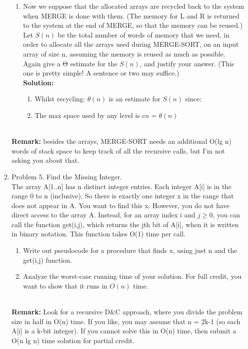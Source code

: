 \documentclass[11pt]{article}
\begin{document}
\begin{enumerate}
\begin{enumerate}
        \item Now we suppose that the allocated arrays are recycled back to the system when MERGE is done with them. (The memory for L and R is returned to the system at the end of MERGE, so that the memory can be reused.) Let $S(n)$ be the total number of words of memory that we need, in order to allocate all the arrays used during MERGE-SORT, on an input array of size n, assuming the memory is reused as much as possible. Again give a Θ estimate for the $S(n)$, and justify your answer. (This one is pretty simple! A sentence or two may suffice.)
        \vspace{0.3cm}\\\textbf{Solution:}
        \begin{enumerate}
            \item Whilst recycling: $\theta (n)$ is an estimate for $S(n)$ since:
            \item The max space used by any level is $cn$ = $\theta (n)$
        \end{enumerate}
        
    \end{enumerate}
        \\
        \textbf{Remark: }besides the arrays, MERGE-SORT needs an additional O(lg n) words of stack space to keep track of all the recursive calls, but I'm not asking you about that.

\item Problem 5. Find the Missing Integer.\\
The array A[1..n] has n distinct integer entries. Each integer A[i] is in the range 0 to n (inclusive). So there is exactly one integer x in the range that does not appear in A. You want to find this x. However, you do not have direct access to the array A. Instead, for an array index i and $j≥0$, you can call the function get(i,j), which returns the jth bit of A[i], when it is written in binary notation. This function takes O(1) time per call.
    \begin{enumerate}
        \item Write out pseudocode for a procedure that finds x, using just n and the get(i,j) function.

        \item Analyze the worst-case running time of your solution. For full credit, you want to show that it runs in $O(n)$ time.
    \end{enumerate}

        \\
        \textbf{Remark: }Look for a recursive D&C approach, where you divide the problem size in half in O(n) time. If you like, you may assume that n = 2k-1 (so each A[i] is a k-bit integer). If you cannot solve this in O(n) time, then submit a O(n lg n) time solution for partial credit.


\end{enumerate}
\end{document}
